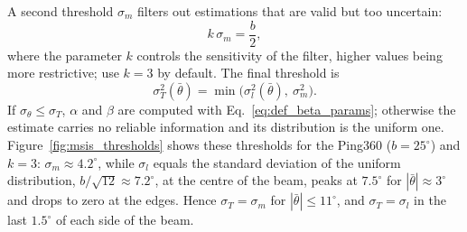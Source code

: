 A second threshold $\sigma_m$ filters out estimations that are valid but too uncertain:
\begin{equation}                         %
  k\,\sigma_m = \frac{b}{2},
  \label{eq:msis_sigmam}
\end{equation}
where the parameter $k$ controls the sensitivity of the filter, higher values being more
restrictive; \citet{breux2020elevation} use $k = 3$ by default. The final threshold is
\begin{equation}                         %
  \sigma_T^2(\bar{\theta}) = \min\big(\sigma_l^2(\bar{\theta}),\ \sigma_m^2\big).
  \label{eq:msis_sigmaT}
\end{equation}
If $\sigma_\theta \leq \sigma_T$, $\alpha$ and $\beta$ are computed with Eq.~\eqref{eq:def_beta_params};
otherwise the estimate carries no reliable information and its distribution is the uniform one.
Figure~\ref{fig:msis_thresholds} shows these thresholds for the Ping360 ($b = 25^\circ$) and $k = 3$:
$\sigma_m \approx 4.2^\circ$, while $\sigma_l$ equals the standard deviation of the uniform
distribution, $b/\sqrt{12} \approx 7.2^\circ$, at the centre of the beam, peaks at $7.5^\circ$ for
$|\bar{\theta}| \approx 3^\circ$ and drops to zero at the edges. Hence $\sigma_T = \sigma_m$ for
$|\bar{\theta}| \leq 11^\circ$, and $\sigma_T = \sigma_l$ in the last $1.5^\circ$ of each side of the beam.

